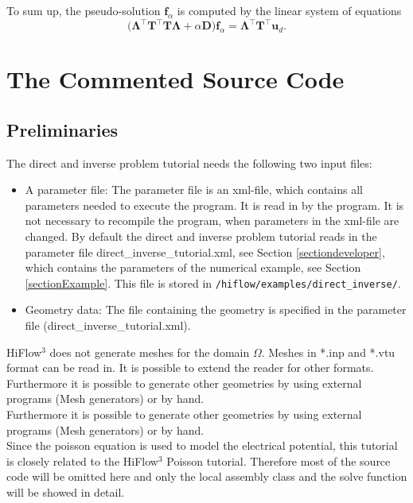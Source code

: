 \documentclass[a4paper, 11pt, twoside]{article}
\begin{document}
To sum up, the pseudo-solution $\boldsymbol{f}_{\alpha}$ is computed by the linear system of equations
\[
\big(\boldsymbol{\Lambda}^\top\boldsymbol{T}^\top\boldsymbol{T\Lambda}
  +\alpha\boldsymbol{D}\big) \boldsymbol{f}_{\alpha} = \boldsymbol{\Lambda}^\top\boldsymbol{T}^\top\boldsymbol{u}_d.
\]

\section{The Commented Source Code}
\subsection{Preliminaries}
The direct and inverse problem tutorial needs the following two input files:
\begin{itemize}
\item A parameter file: The parameter file is an xml-file, which contains all parameters needed to execute the program. It is read in by the program. It is not necessary to recompile the program, when parameters in the xml-file are changed. By default the direct and inverse problem tutorial reads in the parameter file direct\_inverse\_tutorial.xml, see Section \ref{sectiondeveloper}, which contains the parameters of the numerical example, see Section \ref{sectionExample}. This file is stored in \verb'/hiflow/examples/direct_inverse/'.  
\item Geometry data: The file containing the geometry is specified in the parameter file (direct\_inverse\_tutorial.xml).
\end{itemize}

HiFlow$^3$ does not generate meshes for the domain $\Omega$. Meshes in *.inp and *.vtu format can be read in.
It is possible to extend the reader for other formats. Furthermore it is possible to generate other geometries by using external programs (Mesh generators) or by hand.\\
Furthermore it is possible to generate other geometries by using external programs (Mesh generators) or by hand.\\  
Since the poisson equation is used to model the electrical potential, this tutorial is closely related to the HiFlow$^3$ Poisson tutorial. Therefore most of the source code will be omitted here and only the local assembly class and the solve function will be showed in detail.
\end{document}

